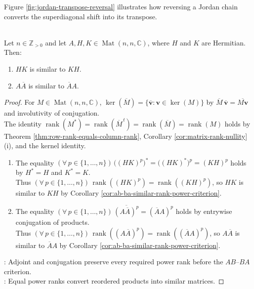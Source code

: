 Figure \ref{fig:jordan-transpose-reversal} illustrates how reversing a Jordan chain converts the superdiagonal shift into its transpose.

\begin{illustrationfigure}[H]
  \centering
  
  \caption{The identity $R_kJ_k(0)R_k=J_k(0)^t$ records the same chain read backwards.}
  \label{fig:jordan-transpose-reversal}
\end{illustrationfigure}

\begin{corollary} \label{cor:hermitian-products-and-conjugate-products} \\
Let $n\in\mathbb{Z}_{>0}$ and let $A,H,K\in\operatorname{Mat}(n,n,\mathbb{C})$, where $H$ and $K$ are Hermitian. Then:
\begin{enumerate}[label=(\roman*)]
\setlength{\itemsep}{0pt}
\item $HK$ is similar to $KH$.
\item $A\overline{A}$ is similar to $\overline{A}A$.
\end{enumerate}
\begin{proof}
For $M\in\operatorname{Mat}(n,n,\mathbb{C})$, $\ker(\overline{M})=\{\overline{\mathbf{v}}:\mathbf{v}\in\ker(M)\}$ by $\overline{M}\,\overline{\mathbf{v}}=\overline{M\mathbf{v}}$ and involutivity of conjugation.\\
The identity $\operatorname{rank}(M^*)=\operatorname{rank}(\overline{M}^{\,t})=\operatorname{rank}(\overline{M})=\operatorname{rank}(M)$ holds by Theorem \ref{thm:row-rank-equals-column-rank}, Corollary \ref{cor:matrix-rank-nullity}(i), and the kernel identity.
\begin{enumerate}[label=(\roman*)]
\setlength{\itemsep}{0pt}
\item The equality $(\forall\,p\in\{1,\ldots,n\})\,\bigl((HK)^p\bigr)^*=\bigl((HK)^*\bigr)^p=(KH)^p$ holds by $H^*=H$ and $K^*=K$.\\
Thus $(\forall\,p\in\{1,\ldots,n\})\,\operatorname{rank}((HK)^p)=\operatorname{rank}((KH)^p)$, so $HK$ is similar to $KH$ by Corollary \ref{cor:ab-ba-similar-rank-power-criterion}.
\item The equality $(\forall\,p\in\{1,\ldots,n\})\,\overline{(A\overline{A})^p}=(\overline{A}A)^p$ holds by entrywise conjugation of products.\\
Thus $(\forall\,p\in\{1,\ldots,n\})\,\operatorname{rank}((A\overline{A})^p)=\operatorname{rank}((\overline{A}A)^p)$, so $A\overline{A}$ is similar to $\overline{A}A$ by Corollary \ref{cor:ab-ba-similar-rank-power-criterion}.
\end{enumerate}
: Adjoint and conjugation preserve every required power rank before the $AB$--$BA$ criterion.\\
: Equal power ranks convert reordered products into similar matrices.
\end{proof}
\end{corollary}

